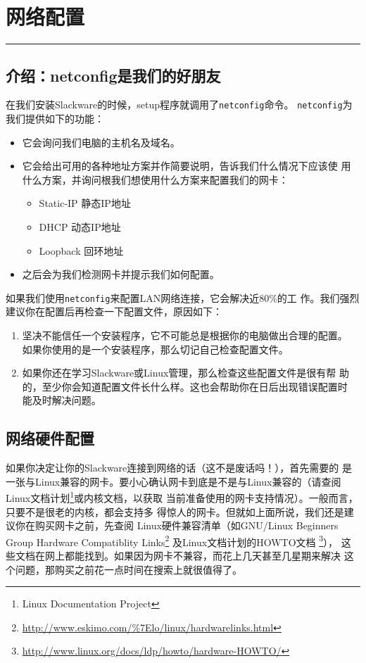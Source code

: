 
\chapter{网络配置}
\label{chap:networkConfiguration}

\begin{flushleft}
\rule[0mm]{\textwidth}{.1pt}
\end{flushleft}

\section{介绍：netconfig是我们的好朋友}
\label{sec:networkConfiguration:netconfig}

在我们安装Slackware的时候，setup程序就调用了\texttt{netconfig}命令。
\texttt{netconfig}为我们提供如下的功能：
\begin{itemize}
\item 它会询问我们电脑的主机名及域名。
\item 它会给出可用的各种地址方案并作简要说明，告诉我们什么情况下应该使
  用什么方案，并询问根我们想使用什么方案来配置我们的网卡：
  \begin{itemize}
  \item Static-IP 静态IP地址
  \item DHCP 动态IP地址
  \item Loopback 回环地址
  \end{itemize}
\item 之后会为我们检测网卡并提示我们如何配置。
\end{itemize}
如果我们使用\texttt{netconfig}来配置LAN网络连接，它会解决近$80\%$的工
作。我们强烈建议你在配置后再检查一下配置文件，原因如下：
\begin{enumerate}
\item 坚决不能信任一个安装程序，它不可能总是根据你的电脑做出合理的配置。
  如果你使用的是一个安装程序，那么切记自己检查配置文件。
\item 如果你还在学习Slackware或Linux管理，那么检查这些配置文件是很有帮
  助的，至少你会知道配置文件长什么样。这也会帮助你在日后出现错误配置时
  能及时解决问题。
\end{enumerate}
                                

\section{网络硬件配置}
\label{sec:networkConfiguration:hardware}
如果你决定让你的Slackware连接到网络的话（这不是废话吗！），首先需要的
是一张与Linux兼容的网卡。要小心确认网卡到底是不是与Linux兼容的（请查阅
Linux文档计划\footnote{Linux Documentation Project}或内核文档，以获取
当前准备使用的网卡支持情况）。一般而言，只要不是很老的内核，都会支持多
得惊人的网卡。但就如上面所说，我们还是建议你在购买网卡之前，先查阅
Linux硬件兼容清单（如GNU/Linux Beginners Group Hardware Compatiblity
Links\footnote{\url{http://www.eskimo.com/\%7Elo/linux/hardwarelinks.html}}
及Linux文档计划的HOWTO文档
\footnote{\url{http://www.linux.org/docs/ldp/howto/hardware-HOWTO/}}），
这些文档在网上都能找到。如果因为网卡不兼容，而花上几天甚至几星期来解决
这个问题，那购买之前花一点时间在搜索上就很值得了。

